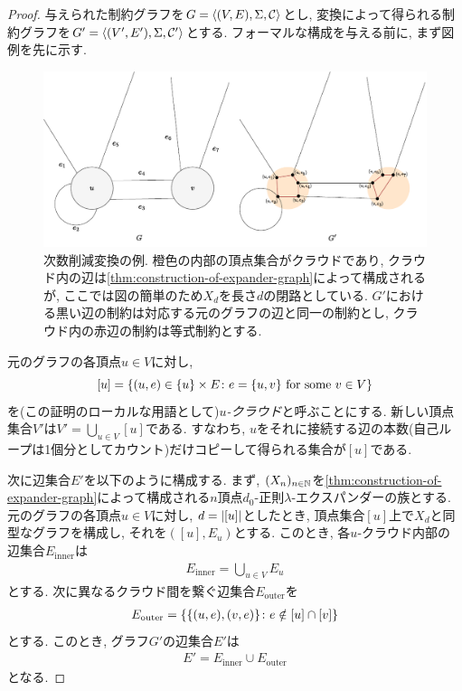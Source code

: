 \begin{proof}

与えられた制約グラフを$G=\langle(V,E),\Sigma,\mathcal{C}\rangle$とし, 変換によって得られる制約グラフを$G'=\langle(V',E'),\Sigma,\mathcal{C}'\rangle$とする.
フォーマルな構成を与える前に, まず図例を先に示す.

\begin{figure}[h]
  \centering
  \includegraphics[width=\textwidth]{images/degree_reduction.pdf}
  \caption{次数削減変換の例. 橙色の内部の頂点集合がクラウドであり, クラウド内の辺は\cref{thm:construction-of-expander-graph}によって構成されるが, ここでは図の簡単のため$X_d$を長さ$d$の閉路としている. $G'$における黒い辺の制約は対応する元のグラフの辺と同一の制約とし, クラウド内の赤辺の制約は等式制約とする.}
  \label{fig:degree-reduction}
\end{figure}

元のグラフの各頂点$u\in V$に対し, 
\[[u]=\qty{ (u,e) \in \{u\}\times E \colon e=\{u,v\} \text{ for some } v\in V }\]
を(この証明のローカルな用語として)\emph{$u$-クラウド}と呼ぶことにする.
新しい頂点集合$V'$は$V'=\bigcup_{u\in V} [u]$である.
すなわち, $u$をそれに接続する辺の本数(自己ループは1個分としてカウント)だけコピーして得られる集合が$[u]$である.

次に辺集合$E'$を以下のように構成する.
まず, $(X_n)_{n\in\mathbb{N}}$を\cref{thm:construction-of-expander-graph}によって構成される$n$頂点$d_0$-正則$\lambda$-エクスパンダーの族とする.
元のグラフの各頂点$u\in V$に対し, $d=\abs{[u]}$としたとき, 頂点集合$[u]$上で$X_d$と同型なグラフを構成し, それを$([u],E_u)$とする.
このとき, 各$u$-クラウド内部の辺集合$E_{\mathrm{inner}}$は
\begin{align*}
  E_{\mathrm{inner}} = \bigcup_{u\in V} E_u
\end{align*}
とする.
次に異なるクラウド間を繋ぐ辺集合$E_{\mathrm{outer}}$を
\begin{align*}
  E_{\mathrm{outer}} = \qty{\qty{ (u,e), (v,e) } \colon e\notin [u]\cap[v]}
\end{align*}
とする.
このとき, グラフ$G'$の辺集合$E'$は
\begin{align*}
  E' = E_{\mathrm{inner}} \cup E_{\mathrm{outer}}
\end{align*}
となる.


\end{proof}

